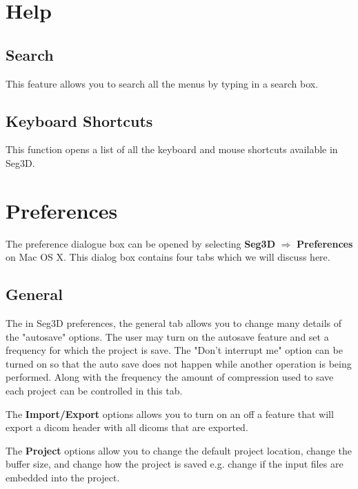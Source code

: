 \documentclass[fleqn,11pt,openany]{book}
\begin{document}
\section{Help}
\subsection{Search}
This feature allows you to search all the menus by typing in a search box.

\subsection{Keyboard Shortcuts}
This function opens a list of all the keyboard and mouse shortcuts available in Seg3D.

\section{Preferences}
\label{sec:preferences}
The preference dialogue box can be opened by selecting \textbf{Seg3D} $\Rightarrow$ \textbf{Preferences} on Mac OS X.
This dialog box contains four tabs which we will discuss here.


\subsection{General}
The in Seg3D preferences, the general tab allows you to change many details of the "autosave" options.  The user
may turn on the autosave feature and set a frequency for which the project is save.  The "Don't interrupt me" option 
can be turned on so that the auto save does not happen while another operation is being performed. Along with the
frequency the amount of compression used to save each project can be controlled in this tab.  

The \textbf{Import/Export} options allows you to turn on an off a feature that will export a dicom header with all dicoms that are
exported.

The \textbf{Project} options allow you to change the default project location, change the buffer size, and change how the project
is saved e.g. change if the input files are embedded into the project.
\end{document}
